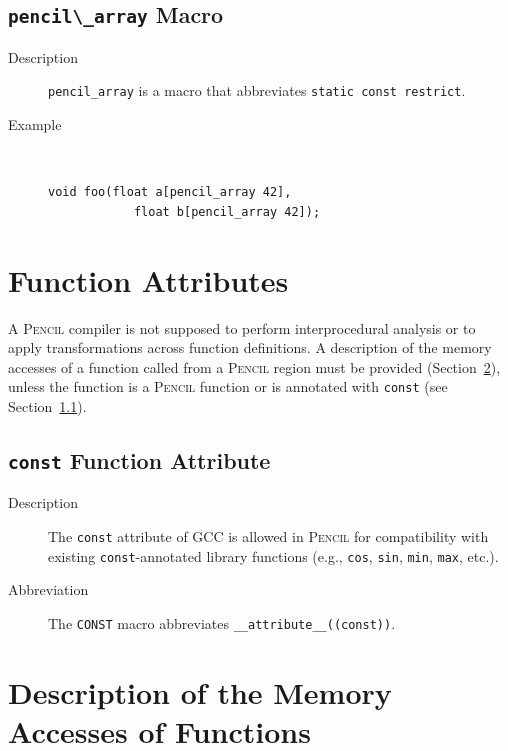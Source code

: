 \documentclass{carp}
\newcommand\pencil{\textsc{Pencil}\xspace}
\begin{document}
\subsection{\lstinline!pencil\_array! Macro}
\begin{description}
\item[Description] \lstinline!pencil_array! is a macro that abbreviates
  \lstinline!static const restrict!.

\item[Example]~
  \begin{lstlisting}[language=pencil]
void foo(float a[pencil_array 42],
            float b[pencil_array 42]);
  \end{lstlisting}
\end{description}

\section{Function Attributes}

A \pencil compiler is not supposed to perform interprocedural analysis or to
apply transformations across function definitions.
A description of the memory accesses of a function called from a \pencil
region must be provided (Section~\ref{sec:mem-acces-info-for-functions}),
unless the function is a \pencil function
or is annotated with \lstinline!const! (see Section~\ref{sec:const-attribute}).

\subsection{\lstinline!const! Function Attribute}
\label{sec:const-attribute}

\begin{description}
\item[Description] The \lstinline!const! attribute of GCC is allowed in
  \pencil for compatibility with existing \lstinline!const!-annotated
  library functions (e.g., \lstinline!cos!, \lstinline!sin!, \lstinline!min!,
  \lstinline!max!, etc.).

\item[Abbreviation] The \lstinline!CONST! macro abbreviates
  \lstinline!__attribute__((const))!.
\end{description}
  
\section{Description of the Memory Accesses of Functions}
\label{sec:mem-acces-info-for-functions}
\end{document}
